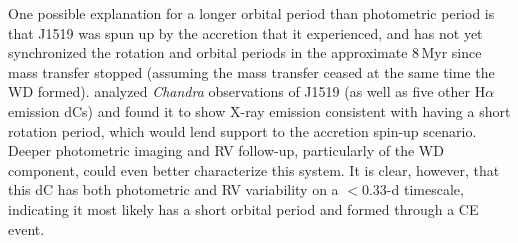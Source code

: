 \documentclass[twocolumn]{aastex631}
\begin{document}
One possible explanation for a longer orbital period than photometric period is that J1519 was spun up by the accretion that it experienced, and has not yet synchronized the rotation and orbital periods in the approximate $8$\,Myr since mass transfer stopped (assuming the mass transfer ceased at the same time the WD formed). \citet{Green2019} analyzed \textit{Chandra} observations of J1519 (as well as five other H$\alpha$ emission dCs) and found it to show X-ray emission consistent with having a short rotation period, which would lend support to the accretion spin-up scenario. Deeper photometric imaging and RV follow-up, particularly of the WD component, could even better characterize this system. It is clear, however, that this dC has both photometric and RV variability on a $<$0.33-d timescale, indicating it most likely has a short orbital period and formed through a CE event.





\end{document}
